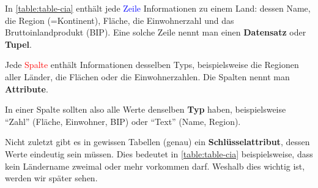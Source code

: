 \begin{table}[H]
  \centering
  \tiny
  \caption{Typische Tabellenstruktur anhand einer Tabelle mit Informationen zu Ländern}
  \label{table:table-cia}
\end{table}
In \cref{table:table-cia} enthält jede \textcolor{blue}{Zeile} Informationen zu einem Land: dessen Name, die Region (=Kontinent), Fläche, die Einwohnerzahl und das Bruttoinlandprodukt (BIP). Eine solche Zeile nennt man einen \textbf{Datensatz} oder \textbf{Tupel}.

Jede \textcolor{red}{Spalte} enthält Informationen desselben Typs, beispielsweise die Regionen aller Länder, die Flächen oder die Einwohnerzahlen. Die Spalten nennt man \textbf{Attribute}.

In einer Spalte sollten also alle Werte denselben \textbf{Typ} haben, beispielsweise \enquote{Zahl} (Fläche, Einwohner, BIP) oder
\enquote{Text} (Name, Region).

Nicht zuletzt gibt es in gewissen Tabellen (genau) ein \textbf{Schlüsselattribut}, dessen Werte eindeutig sein müssen.
Dies bedeutet in \cref{table:table-cia} beispielsweise, dass kein Ländername zweimal oder mehr vorkommen darf. Weshalb dies wichtig ist, werden wir später sehen.

